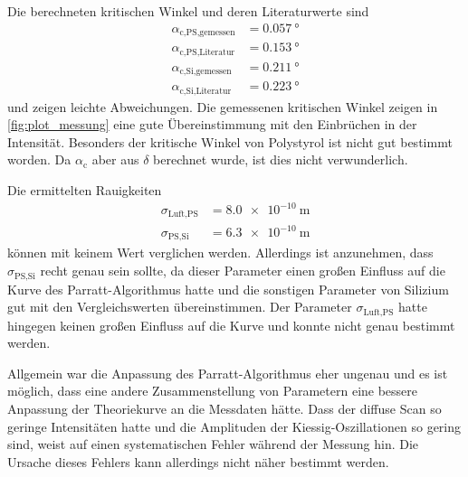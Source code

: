Die berechneten kritischen Winkel und deren Literaturwerte sind
\begin{align*}
    \alpha_\text{c,PS,gemessen} &= \SI{0.057}{\degree} \\
    \alpha_\text{c,PS,Literatur} &= \SI{0.153}{\degree} \\
    \alpha_\text{c,Si,gemessen} &= \SI{0.211}{\degree} \\
    \alpha_\text{c,Si,Literatur} &= \SI{0.223}{\degree}
\end{align*} 
und zeigen leichte Abweichungen.
Die gemessenen kritischen Winkel zeigen in \autoref{fig:plot_messung} eine gute Übereinstimmung mit den Einbrüchen in der Intensität.
Besonders der kritische Winkel von Polystyrol ist nicht gut bestimmt worden.
Da $\alpha_\text{c}$ aber aus $\delta$ berechnet wurde, ist dies nicht verwunderlich.

Die ermittelten Rauigkeiten
\begin{align*}
    \sigma_\text{Luft,PS} &= \SI{8.0e-10}{\meter} \\
    \sigma_\text{PS,Si} &= \SI{6.3e-10}{\meter}
\end{align*}
können mit keinem Wert verglichen werden.
Allerdings ist anzunehmen, dass $\sigma_\text{PS,Si}$ recht genau sein sollte, 
da dieser Parameter einen großen Einfluss auf die Kurve des Parratt-Algorithmus hatte 
und die sonstigen Parameter von Silizium gut mit den Vergleichswerten übereinstimmen.
Der Parameter $\sigma_\text{Luft,PS}$ hatte hingegen keinen großen Einfluss auf die Kurve und konnte nicht genau bestimmt werden.

Allgemein war die Anpassung des Parratt-Algorithmus eher ungenau und es ist möglich, 
dass eine andere Zusammenstellung von Parametern eine bessere Anpassung der Theoriekurve an die Messdaten hätte.
Dass der diffuse Scan so geringe Intensitäten hatte und die Amplituden der Kiessig-Oszillationen so gering sind,
weist auf einen systematischen Fehler während der Messung hin.
Die Ursache dieses Fehlers kann allerdings nicht näher bestimmt werden.
